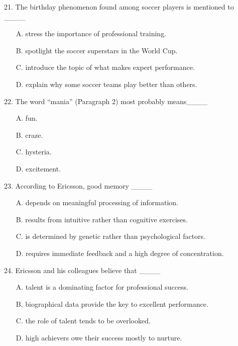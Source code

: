 \documentclass[UTF8,11pt]{ctexart}
\begin{document}
21. The birthday phenomenon found among soccer players is mentioned to \_\_\_\_


\begin{itemize}[leftmargin=2em,itemsep=.2em,topsep=.4em]\item[A.] stress the importance of professional training.
\item[B.] spotlight the soccer superstars in the World Cup.
\item[C.] introduce the topic of what makes expert performance.
\item[D.] explain why some soccer teams play better than others.
\end{itemize}

22. The word “mania” (Paragraph 2) most probably means\_\_\_\_


\begin{itemize}[leftmargin=2em,itemsep=.2em,topsep=.4em]\item[A.] fun.
\item[B.] craze.
\item[C.] hysteria.
\item[D.] excitement.
\end{itemize}

23. According to Ericsson, good memory \_\_\_\_


\begin{itemize}[leftmargin=2em,itemsep=.2em,topsep=.4em]\item[A.] depends on meaningful processing of information.
\item[B.] results from intuitive rather than cognitive exercises.
\item[C.] is determined by genetic rather than psychological factors.
\item[D.] requires immediate feedback and a high degree of concentration.
\end{itemize}

24. Ericsson and his colleagues believe that \_\_\_\_


\begin{itemize}[leftmargin=2em,itemsep=.2em,topsep=.4em]\item[A.] talent is a dominating factor for professional success.
\item[B.] biographical data provide the key to excellent performance.
\item[C.] the role of talent tends to be overlooked.
\item[D.] high achievers owe their success mostly to nurture.
\end{itemize}
\end{document}
